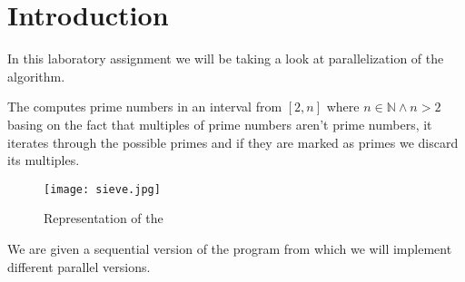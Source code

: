 \section{Introduction}
\justify
In this laboratory assignment we will be taking a look at \omp parallelization of the \sieve algorithm.
 
 \justify
The \sieve computes prime numbers in an interval from $[2,n]$ where $n\in \mathbb{N} \wedge n > 2$ basing on the fact that multiples of prime numbers aren't prime numbers, it iterates through the possible primes and if they are marked as primes we discard its multiples. 

\begin{figure}[h!]
    \centering
    \texttt{[image: sieve.jpg]}
    \caption{Representation of the \sieve}
    \label{fig:tareador}
\end{figure}

\justify
We are given a sequential version of the program from which we will implement different parallel versions.


